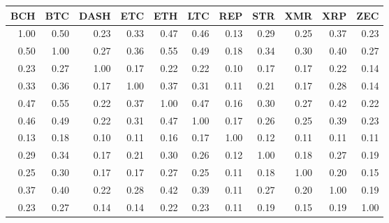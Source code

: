\begin{tabular}{rrrrrrrrrrr}
  \toprule
BCH & BTC & DASH & ETC & ETH & LTC & REP & STR & XMR & XRP & ZEC \\ 
  \midrule
1.00 & 0.50 & 0.23 & 0.33 & 0.47 & 0.46 & 0.13 & 0.29 & 0.25 & 0.37 & 0.23 \\ 
  0.50 & 1.00 & 0.27 & 0.36 & 0.55 & 0.49 & 0.18 & 0.34 & 0.30 & 0.40 & 0.27 \\ 
  0.23 & 0.27 & 1.00 & 0.17 & 0.22 & 0.22 & 0.10 & 0.17 & 0.17 & 0.22 & 0.14 \\ 
  0.33 & 0.36 & 0.17 & 1.00 & 0.37 & 0.31 & 0.11 & 0.21 & 0.17 & 0.28 & 0.14 \\ 
  0.47 & 0.55 & 0.22 & 0.37 & 1.00 & 0.47 & 0.16 & 0.30 & 0.27 & 0.42 & 0.22 \\ 
  0.46 & 0.49 & 0.22 & 0.31 & 0.47 & 1.00 & 0.17 & 0.26 & 0.25 & 0.39 & 0.23 \\ 
  0.13 & 0.18 & 0.10 & 0.11 & 0.16 & 0.17 & 1.00 & 0.12 & 0.11 & 0.11 & 0.11 \\ 
  0.29 & 0.34 & 0.17 & 0.21 & 0.30 & 0.26 & 0.12 & 1.00 & 0.18 & 0.27 & 0.19 \\ 
  0.25 & 0.30 & 0.17 & 0.17 & 0.27 & 0.25 & 0.11 & 0.18 & 1.00 & 0.20 & 0.15 \\ 
  0.37 & 0.40 & 0.22 & 0.28 & 0.42 & 0.39 & 0.11 & 0.27 & 0.20 & 1.00 & 0.19 \\ 
  0.23 & 0.27 & 0.14 & 0.14 & 0.22 & 0.23 & 0.11 & 0.19 & 0.15 & 0.19 & 1.00 \\ 
   \bottomrule
\end{tabular}
